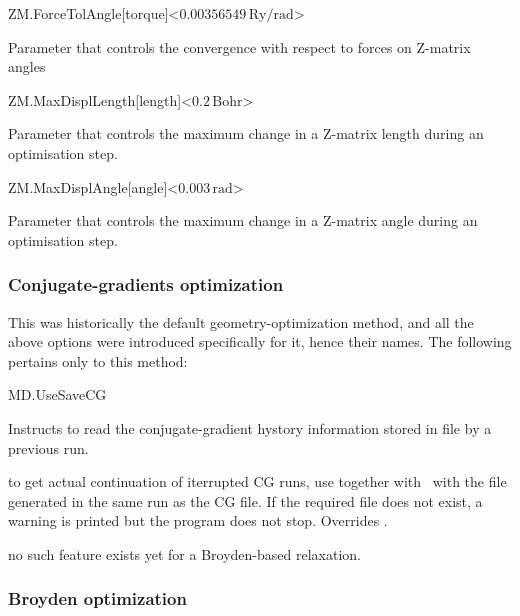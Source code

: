 \begin{fdfentry}{ZM.ForceTolAngle}[torque]<$0.00356549\,\mathrm{Ry/rad}$>
  
  Parameter that controls the convergence with respect to forces on
  Z-matrix angles

\end{fdfentry}

\begin{fdfentry}{ZM.MaxDisplLength}[length]<$0.2\,\mathrm{Bohr}$>
  
  Parameter that controls the maximum change in a Z-matrix length
  during an optimisation step.

\end{fdfentry}

\begin{fdfentry}{ZM.MaxDisplAngle}[angle]<$0.003\,\mathrm{rad}$>
  
  Parameter that controls the maximum change in a Z-matrix angle
  during an optimisation step.

\end{fdfentry}



\subsubsection{Conjugate-gradients optimization}

This was historically the default geometry-optimization method, and
all the above options were introduced specifically for it, hence their
names. The following pertains only to this method:

\begin{fdflogicalF}{MD.UseSaveCG}

  Instructs to read the conjugate-gradient hystory information stored
  in file  by a previous run.

  \note to get actual continuation of iterrupted CG runs, use
  together with  \fdftrue\ with the 
  file generated in the same run as the CG file.  If the required file
  does not exist, a warning is printed but the program does not
  stop. Overrides .

  \note no such feature exists yet for a Broyden-based relaxation.

\end{fdflogicalF}

\subsubsection{Broyden optimization}

